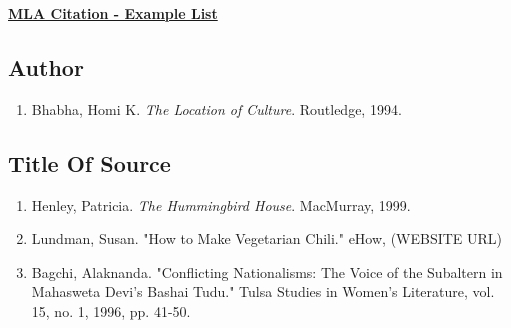 \documentclass[12pt]{article} %
\begin{document}
	\renewcommand*{\coursecode}{MATH 235} %
	\renewcommand*{\assgnnumber}{Assignment 1} %
	\renewcommand*{\submdate}{September 14, 2021} %
	\renewcommand*{\studentfname}{Abdullah} %
	\renewcommand*{\studentlname}{Zubair} %
    \renewcommand*{\proofname}{Proof:}

	\renewcommand\qedsymbol{$\blacksquare$}
	\setfigpath
	\fancyhfoffset[L,O]{0pt} %





\begin{center}
  \textbf{\underline{\Huge{MLA Citation - Example List}}}
\end{center}


\subsection*{Author}
\begin{enumerate}
  \item Bhabha, Homi K. \textit{The Location of Culture}. Routledge, 1994.
\end{enumerate}


\subsection*{Title Of Source}
\begin{enumerate}
  \item Henley, Patricia. \textit{The Hummingbird House}. MacMurray, 1999.
  \item Lundman, Susan. "How to Make Vegetarian Chili." eHow, (WEBSITE URL)
  \item Bagchi, Alaknanda. "Conflicting Nationalisms: The Voice of the Subaltern in Mahasweta Devi's Bashai Tudu." Tulsa Studies in Women's Literature, vol. 15, no. 1, 1996, pp. 41-50.
\end{enumerate}
\end{document}
